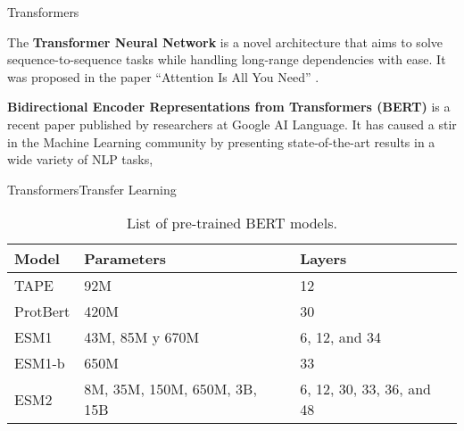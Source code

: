 \documentclass[10pt]{beamer}
\newcommand{\1}{
	\setbeamertemplate{background}{
		\texttt{[image: ../img/1]}
		\tikz[overlay] \fill[fill opacity=0.75,fill=white] (0,0) rectangle (-\paperwidth,\paperheight);
	}
}
\begin{document}
	
	
	\begin{frame}{Transformers}{}
		
		\begin{block}{}
			The \textbf{Transformer Neural Network} is a novel architecture that aims to solve sequence-to-sequence tasks while handling long-range dependencies with ease. It was proposed in the paper ``Attention Is All You Need'' \cite{vaswani2017attention}. 
		\end{block}
		
		\begin{block}{}
			\textbf{Bidirectional Encoder Representations from Transformers (BERT)} \cite{devlin2018bert} is a recent paper published by researchers at Google AI Language. It has caused a stir in the Machine Learning community by presenting state-of-the-art results in a wide variety of NLP tasks,
		\end{block}
		
	\end{frame}
	
	
	\begin{frame}{Transformers}{Transfer Learning}
		
		\begin{table}[]
			
			\caption{List of pre-trained BERT models.}
			\setlength{\tabcolsep}{0.8em} %
			{\renewcommand{\arraystretch}{1.1}%
				
				\begin{tabular}{lp{3cm}p{3cm}}
					\textbf{Model} & \textbf{Parameters}          & \textbf{Layers} \\ \hline
					TAPE           & 92M                          & 12                        \\
					ProtBert       & 420M                         & 30                        \\
					ESM1           & 43M, 85M y 670M              & 6, 12, and 34             \\
					ESM1-b         & 650M                         & 33                        \\
					ESM2           & 8M, 35M, 150M, 650M, 3B, 15B & 6, 12, 30, 33, 36, and 48
				\end{tabular}
				
			}
		\end{table}
		
		
	\end{frame}
	
\end{document}
